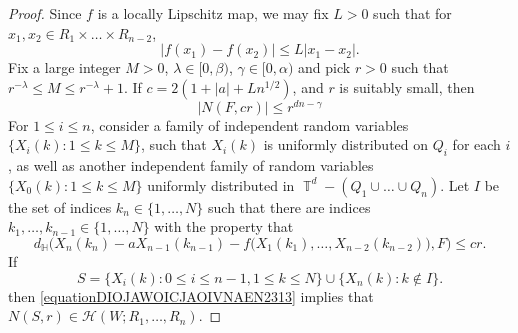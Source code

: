 \documentclass[dvipsnames,letterpaper,12pt]{article}
\numberwithin{equation}{section}
\DeclareMathOperator{\TT}{\mathbb{T}}
\numberwithin{theorem}{section}
\begin{document}
\begin{proof}
    Since $f$ is a locally Lipschitz map, we may fix $L > 0$ such that for $x_1,x_2 \in R_1 \times \dots \times R_{n-2}$,
    \begin{equation} \label{equationDIOJAWOICJAOIVNAEN2313}
        |f(x_1) - f(x_2)| \leq L |x_1 - x_2|.
    \end{equation}
    Fix a large integer $M > 0$, $\lambda \in [0,\beta)$, $\gamma \in [0,\alpha)$ and pick $r > 0$ such that $r^{-\lambda} \leq M \leq r^{-\lambda} + 1$. If $c = 2(1 + |a| + L n^{1/2})$, and $r$ is suitably small, then
    \begin{equation} \label{equationAIOCJAOICJAWOICNIJNIJNQORI}
        |N(F,cr)| \leq r^{dn - \gamma}
    \end{equation}
    For $1 \leq i \leq n$, consider a family of independent random variables $\{ X_i(k): 1 \leq k \leq M \}$, such that $X_i(k)$ is uniformly distributed on $Q_i$ for each $i$, as well as another independent family of random variables $\{ X_0(k): 1 \leq k \leq M \}$ uniformly distributed in $\TT^d - (Q_1 \cup \dots \cup Q_n)$. Let $I$ be the set of indices $k_n \in \{ 1, \dots, N \}$ such that there are indices $k_1,\dots,k_{n-1} \in \{ 1, \dots, N \}$ with the property that
    \begin{equation}
        d_{\mathbb{H}} \Big( X_n(k_n) - a X_{n-1}(k_{n-1}) - f \big( X_1(k_1), \dots, X_{n-2}(k_{n-2}) \big), F \Big) \leq cr.
    \end{equation}
    If
    \[ S = \{ X_i(k) : 0 \leq i \leq n-1, 1 \leq k \leq N \} \cup \{ X_n(k): k \not \in I \}. \]
    then \eqref{equationDIOJAWOICJAOIVNAEN2313} implies that $N(S,r) \in \mathcal{H}(W;R_1,\dots,R_n)$.


\end{proof}
\end{document}
